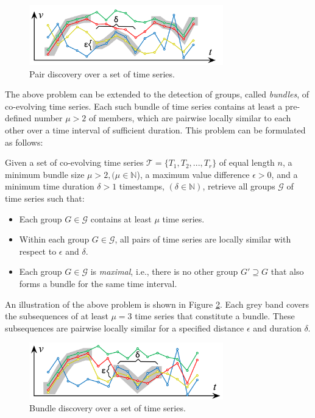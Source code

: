 \begin{figure}[tb]
    \centering
    \includegraphics[width=0.75\textwidth]{figures/sim_join.png}
    \caption{Pair discovery over a set of time series.}
    \label{fig:sim_join}
\end{figure}

The above problem can be extended to the detection of groups, called \textit{bundles}, of co-evolving time series. Each such bundle of time series contains at least a pre-defined number $\mu>2$ of members, which are pairwise locally similar to each other over a time interval of sufficient duration. This problem can be formulated as follows:

\begin{problem}
Given a set of co-evolving time series $\mathcal{T}=\{T_1,T_2,...,T_r\}$ of equal length $n$, a minimum bundle size $\mu > 2, (\mu \in \mathbb{N}$), a maximum value difference $\epsilon>0$, and a minimum time duration $\delta>1$ timestamps, $(\delta \in \mathbb{N})$, retrieve all groups $\mathcal{G}$ of time series such that:
\begin{itemize}
    \item Each group $G \in \mathcal{G}$ contains at least $\mu$ time series.
    \item Within each group $G \in \mathcal{G}$, all pairs of time series are locally similar with respect to $\epsilon$ and $\delta$.
    \item Each group $G \in \mathcal{G}$ is \textit{maximal}, i.e., there is no other group $G' \supseteq G$ that also forms a bundle for the same time interval. 
\end{itemize}
\end{problem}

An illustration of the above problem is shown in Figure \ref{fig:bundle_disc}. Each grey band covers the subsequences of at least $\mu=3$ time series that constitute a bundle. These subsequences are pairwise locally similar for a specified distance $\epsilon$ and duration $\delta$.

\begin{figure}[tb]
    \centering
    \includegraphics[width=0.75\textwidth]{figures/bundle_disc.png}
    \caption{Bundle discovery over a set of time series.}
    \label{fig:bundle_disc}
\end{figure}